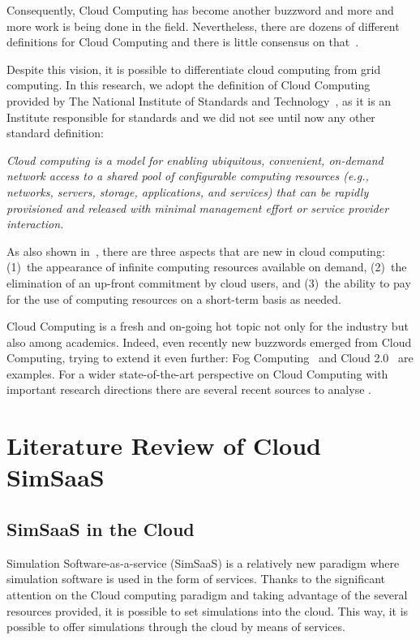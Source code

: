 \documentclass[conference]{IEEEtran}
\begin{document}
Consequently, Cloud Computing has become another buzzword and more and more work is being done in the field. Nevertheless, there are dozens of different definitions for Cloud Computing and there is little consensus on that~\cite{geelan2009twenty}.

Despite this vision, it is possible to differentiate cloud computing from grid computing. In this research, we adopt the definition of Cloud Computing provided by The National Institute of Standards and Technology~\cite{mell2011nist}, as it is an Institute responsible for standards and we did not see until now any other standard definition:

\textit{Cloud computing is a model for enabling ubiquitous, convenient, on-demand network access to a shared pool of configurable computing resources (e.g., networks, servers, storage, applications, and services) that can be rapidly provisioned and released with minimal management effort or service provider interaction.}

As also shown in~\cite{armbrust2010view}, there are three aspects that are new in cloud computing: (1)~the appearance of infinite computing resources available on demand, (2)~the elimination of an up-front commitment by cloud users, and (3)~the ability to pay for the use of computing resources on a short-term basis as needed.

Cloud Computing is a fresh and on-going hot topic not only for the industry but also among academics. Indeed, even recently new buzzwords emerged from Cloud Computing, trying to extend it even further: Fog Computing~\cite{bonomi2012fog} and Cloud 2.0~\cite{miluzzo2014m} are examples. For a wider state-of-the-art perspective on Cloud Computing with important research directions there are several recent sources to analyse \cite{gonzalez2015cloud} \cite{zhang2010cloud} \cite{Sun2014134} \cite{Abdelmaboud2015159} \cite{he2014state} \cite{abolfazli2015mobile}.


\section{Literature Review of Cloud SimSaaS}

\subsection{SimSaaS in the Cloud}

Simulation Software-as-a-service (SimSaaS) is a relatively new paradigm where simulation software is used in the form of services. Thanks to the significant attention on the Cloud computing paradigm and taking advantage of the several resources provided, it is possible to set simulations into the cloud. This way, it is possible to offer simulations through the cloud by means of services. 
\end{document}
